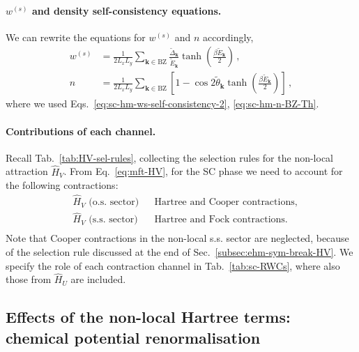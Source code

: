 \paragraph{$w^{(s)}$ and density self-consistency equations.}

We can rewrite the equations for $w^{(s)}$ and $n$ accordingly,
\begin{align}
	w^{(s)} &= \frac{1}{2L_x L_y} \sum_{\mathbf{k} \in \mathrm{BZ}} \frac{\tilde{\Delta}_\mathbf{k}}{\tilde{E}_\mathbf{k}} \tanh(\frac{\beta \tilde{E}_\mathbf{k}}{2}) \, ,
	\label{eq:sc-ehm-ws-self-consistency} \\
	n &= \frac{1}{2L_x L_y} \sum_{\mathbf{k} \in \mathrm{BZ}} \left[
	1 - \cos 2\tilde{\theta}_\mathbf{k} \tanh(\frac{\beta \tilde{E}_\mathbf{k}}{2})
	\right] \, , \label{eq:sc-ehm-n-BZ-Th}
\end{align}
where we used Eqs.~\eqref{eq:sc-hm-ws-self-consistency-2}, \eqref{eq:sc-hm-n-BZ-Th}.

\paragraph{Contributions of each channel.}

Recall Tab.~\ref{tab:HV-sel-rules}, collecting the selection rules for the non-local attraction $\hat H_V$. From Eq.~\eqref{eq:mft-HV}, for the SC phase we need to account for the following contractions:
\[
\begin{aligned}
	&\hat H_V \text{ (o.s. sector)}
	&&\text{Hartree and Cooper contractions,} \\
	&\hat H_V \text{ (s.s. sector)}
	&&\text{Hartree and Fock contractions.} \\
\end{aligned}	
\]
Note that Cooper contractions in the non-local s.s. sector are neglected, because of the selection rule discussed at the end of Sec.~\ref{subsec:ehm-sym-break-HV}. We specify the role of each contraction channel in Tab.~\ref{tab:sc-RWCs}, where also those from $\hat H_U$ are included.

\subsection{Effects of the non-local Hartree terms: chemical potential renormalisation}\label{subsec:sc-hartree-mu}

